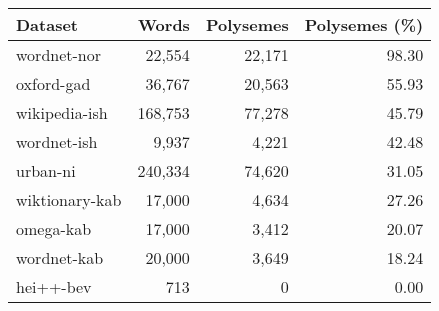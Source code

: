\begin{tabular}{|l|rrr|}
    \hline
    Dataset        & Words   & Polysemes & Polysemes (\%) \\
    \hline
    wordnet-nor    & 22,554  & 22,171    & 98.30          \\
    oxford-gad     & 36,767  & 20,563    & 55.93          \\
    wikipedia-ish  & 168,753 & 77,278    & 45.79          \\
    wordnet-ish    & 9,937   & 4,221     & 42.48          \\
    urban-ni       & 240,334 & 74,620    & 31.05          \\
    wiktionary-kab & 17,000  & 4,634     & 27.26          \\
    omega-kab      & 17,000  & 3,412     & 20.07          \\
    wordnet-kab    & 20,000  & 3,649     & 18.24          \\
    hei++-bev      & 713     & 0         & 0.00           \\
    \hline
\end{tabular}
